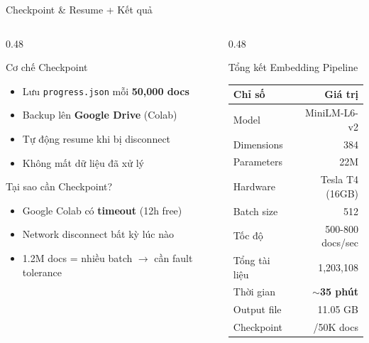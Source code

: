 \begin{frame}{Checkpoint \& Resume + Kết quả}
\begin{columns}[T]
\begin{column}{0.48\textwidth}

\begin{block}{Cơ chế Checkpoint}
{\footnotesize
\begin{itemize}\itemsep0pt \parskip0pt 
    \item Lưu \texttt{progress.json} mỗi \textbf{50,000 docs}
    \item Backup lên \textbf{Google Drive} (Colab)
    \item Tự động resume khi bị disconnect
    \item Không mất dữ liệu đã xử lý
\end{itemize}
}
\end{block}

\vspace{0.05cm}

\begin{exampleblock}{Tại sao cần Checkpoint?}
{\footnotesize
\begin{itemize}\itemsep0pt \parskip0pt 
    \item Google Colab có \textbf{timeout} (12h free)
    \item Network disconnect bất kỳ lúc nào
    \item 1.2M docs = nhiều batch $\to$ cần fault tolerance
\end{itemize}
}
\end{exampleblock}

\end{column}
\begin{column}{0.48\textwidth}

\begin{block}{Tổng kết Embedding Pipeline}
\centering
\renewcommand{\arraystretch}{1.0}
{\footnotesize
\begin{tabular}{l r}
\toprule
\textbf{Chỉ số} & \textbf{Giá trị} \\
\midrule
Model & MiniLM-L6-v2 \\
Dimensions & 384 \\
Parameters & 22M \\
Hardware & Tesla T4 (16GB) \\
Batch size & 512 \\
Tốc độ & 500-800 docs/sec \\
Tổng tài liệu & 1,203,108 \\
Thời gian & \textbf{$\sim$35 phút} \\
Output file & 11.05 GB \\
Checkpoint & /50K docs \\
\bottomrule
\end{tabular}
}
\end{block}

\end{column}
\end{columns}
\end{frame}
